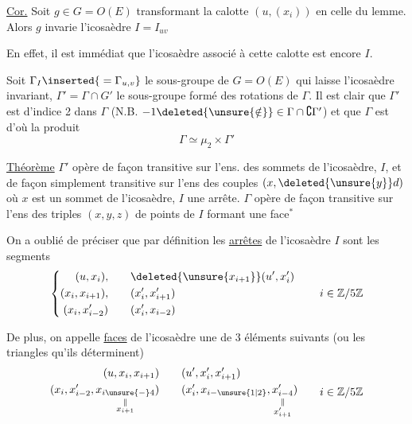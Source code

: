 \uline{Cor.} Soit  $g\in G=O(E)$ transformant la calotte $(u,(x_i))$ en celle du lemme. Alors $g$ invarie l'icosaèdre $I=I_{uv}$

En effet, il est immédiat que l'icosaèdre associé à cette  calotte est encore $I$.

Soit $\Gamma_I\inserted{{}=\Gamma_{u,v}}$ le sous-groupe de $G=O(E)$ qui laisse l'icosaèdre  invariant, $\Gamma'=\Gamma\cap G'$ le sous-groupe formé des rotations de $\Gamma$. Il est clair que $\Gamma'$ est d'indice 2 dans $\Gamma$ (N.B. $-1\deleted{\unsure{\notin}}\in\Gamma\cap\complement\Gamma'$) et que $\Gamma$ est d'où la produit
\[
\Gamma\simeq\mu_2\times\Gamma'
\]

\uline{Théorème} $\Gamma'$ opère de façon transitive sur l'ens. des sommets de l'icosaèdre, $I$, et de façon simplement transitive sur l'ens des couples $(x,\deleted{\unsure{y}}d)$ où $x$ est un sommet de l'icosaèdre, $I$ une arrête. $\Gamma$ opère de façon  transitive sur l'ens des triples $(x,y,z)$ de points de $I$ formant une face$^{*}$

On a oublié de préciser que par définition les \uline{arrêtes} de l'icosaèdre $I$ sont les  segments  
\[
\left\{\begin{aligned}
(u,x_i),&\qquad \deleted{\unsure{x_{i+1}}}(u',x'_i)\\
(x_i,x_{i+1}),&\qquad (x'_i,x'_{i+1})\\
(x_i,x'_{i-2})&\qquad (x'_i,x_{i-2})
\end{aligned}\right.\qquad i\in\mathbb Z/5\mathbb Z
\]

De plus, on appelle \uline{faces} de l'icosaèdre une   de $3$   éléments  suivants (ou les triangles qu'ils déterminent)
\[
\begin{aligned}
(u,x_i,x_{i+1})&\qquad (u',x'_i,x'_{i+1})\\
(x_i,x'_{i-2},\underset{\substack{\Vert\\x_{i+1}}}{x_{i\unsure{-}4}})&\qquad
(x'_i,x_{i-\unsure{1|2}},\underset{\substack{\Vert\\x'_{i+1}}}{x'_{i-4}})
\end{aligned}\qquad i\in\mathbb Z/5\mathbb Z
\]

